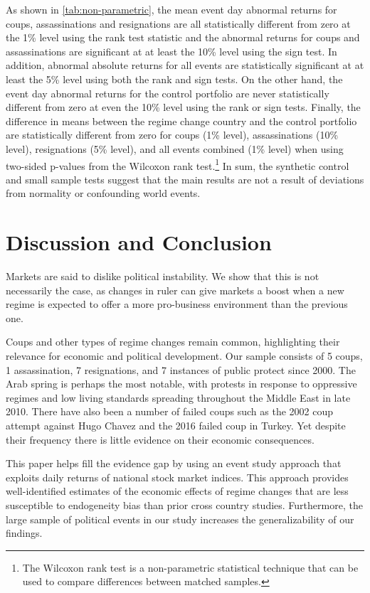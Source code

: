 \documentclass[12pt,final,fleqn]{article}
\theoremstyle{plain}
\begin{document}
As shown in \autoref{tab:non-parametric}, the mean event day abnormal returns for coups, assassinations and resignations are all statistically different from zero at the 1\% level using the rank test statistic and the abnormal returns for coups and assassinations are significant at at least the 10\% level using the sign test. In addition, abnormal absolute returns for all events are statistically significant at at least the 5\% level using both the rank and sign tests. On the other hand, the event day abnormal returns for the control portfolio are never statistically different from zero at even the 10\% level using the rank or sign tests. Finally, the difference in means between the regime change country and the control portfolio are statistically different from zero for coups (1\% level), assassinations (10\% level), resignations (5\% level), and all events combined (1\% level) when using two-sided p-values from the Wilcoxon rank test.\footnote{The Wilcoxon rank test is a non-parametric statistical technique that can be used to compare differences between matched samples.} In sum, the synthetic control and small sample tests suggest that the main results are not a result of deviations from normality or confounding world events.

\section{Discussion and Conclusion}

Markets are said to dislike political instability. We show that this is not necessarily the case, as changes in ruler can give markets a boost when a new regime is expected to offer a more pro-business environment than the previous one. 

Coups and other types of regime changes remain common, highlighting their relevance for economic and political development. Our sample consists of 5 coups, 1 assassination, 7 resignations, and 7 instances of public protect since 2000. The Arab spring is perhaps the most notable, with protests in response to oppressive regimes and low living standards spreading throughout the Middle East in late 2010. There have also been a number of failed coups such as the 2002 coup attempt against Hugo Chavez and the 2016 failed coup in Turkey. Yet despite their frequency there is little evidence on their economic consequences.

This paper helps fill the evidence gap by using an event study approach that exploits daily returns of national stock market indices. This approach provides well-identified estimates of the economic effects of regime changes that are less susceptible to endogeneity bias than prior cross country studies. Furthermore, the large sample of political events in our study increases the generalizability of our findings.  
\end{document}
